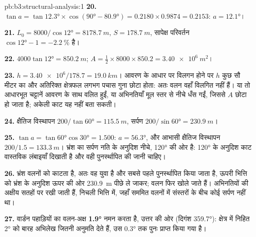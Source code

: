 \begin{solution}{pb:b3:structural-analysis:1}
\textbf{20.} $\tan a = \tan\ang{12.3}\times\cos(\ang{90} - \ang{80.9}) =
0.2180\times0.9874 = 0.2153$: $a = \ang{12.1}$।

\textbf{21.} $L_0 = 8000/\cos\ang{12} = \qty{8178.7}{m}$, $S =
\qty{178.7}{m}$, सापेक्ष परिवर्तन $\cos\ang{12} - 1 =
\qty{-2.2}{\percent}$ है।

\textbf{22.} $4000\tan\ang{12} = \qty{850.2}{m}$; $A = \tfrac12\times8000\times
850.2 = \qty{3.40e6}{m^2}$।

\textbf{23.} $h = \num{3.40e6}/178.7 = \qty{19.0}{km}$। आवरण के आधार पर विलगन
होने पर $h$ कुछ सौ मीटर का और अतिरिक्त क्षेत्रफल
लगभग पचास गुना छोटा होता: अतः वलन वहाँ विलगित नहीं हैं।
या तो आधारभूत चट्टानें आवरण के साथ वलित हुईं, या अभिनतियाँ मूल
स्तर से नीचे धँस गईं, जिससे $A$ छोटा हो जाता है; अकेली काट यह नहीं बता सकती।

\textbf{24.} क्षैतिज विस्थापन $200/\tan\ang{60} = \qty{115.5}{m}$, सर्पण $200/\sin\ang{60}
= \qty{230.9}{m}$।

\textbf{25.} $\tan a = \tan\ang{60}\cos\ang{30} = 1.500$: $a = \ang{56.3}$, और
आभासी क्षैतिज विस्थापन $200/1.5 = \qty{133.3}{m}$। भ्रंश का सर्पण
नति के अनुदिश नीचे, \ang{120} की ओर है: \ang{120} के अनुदिश काट वास्तविक
लंबाइयाँ दिखाती है और वही पुनर्स्थापित की जानी चाहिए।

\textbf{26.} भ्रंश वलनों को काटता है, अतः वह युवा है और सबसे पहले पुनर्स्थापित किया जाता है,
ऊपरी भित्ति को भ्रंश के अनुदिश ऊपर की ओर \qty{230.9}{m} पीछे ले जाकर; वलन
फिर खोले जाते हैं।  अभिनतियों की अक्षीय सतहों पर रखी जाती हैं, निचली भित्ति में,
जहाँ सममित वलनों में संस्तरों के बीच कोई सर्पण नहीं था।

\textbf{27.} वार्डन पहाड़ियों का वलन-अक्ष
\textbf{\ang[text-series-to-math=true]{1.9}} नमन करता है, उत्तर की ओर (दिगंश
\ang{359.7}): क्षेत्र में निहित \ang{2} को
बारह अभिलेख जितनी अनुमति देते हैं, उस \ang{0.3} तक पुनः प्राप्त किया गया है।
\end{solution}
